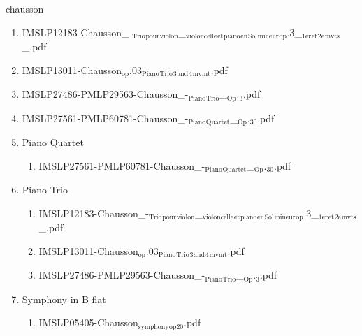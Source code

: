 \documentclass[11pt]{article}
\begin{document}
\item chausson
\label{sec-1-1-1-1-44-20}
\begin{enumerate}
\item IMSLP12183-Chausson\_-$_{\text{Trio}}$$_{\text{pour}}$$_{\text{violon}}$\_$_{\text{violoncelle}}$$_{\text{et}}$$_{\text{piano}}$$_{\text{en}}$$_{\text{Sol}}$$_{\text{mineur}}$$_{\text{op}}$.3\_$_{\text{1er}}$$_{\text{et}}$$_{\text{2e}}$$_{\text{mvts}}$\_.pdf
\label{sec-1-1-1-1-44-20-1}

\item IMSLP13011-Chausson$_{\text{op}}$.03$_{\text{Piano}}$$_{\text{Trio}}$$_{\text{3}}$$_{\text{and}}$$_{\text{4}}$$_{\text{mvmt}}$.pdf
\label{sec-1-1-1-1-44-20-2}

\item IMSLP27486-PMLP29563-Chausson\_-$_{\text{Piano}}$$_{\text{Trio}}$\_$_{\text{Op}}$.$_{\text{3}}$.pdf
\label{sec-1-1-1-1-44-20-3}

\item IMSLP27561-PMLP60781-Chausson\_-$_{\text{Piano}}$$_{\text{Quartet}}$\_$_{\text{Op}}$.$_{\text{30}}$.pdf
\label{sec-1-1-1-1-44-20-4}

\item Piano Quartet
\label{sec-1-1-1-1-44-20-5}
\begin{enumerate}
\item IMSLP27561-PMLP60781-Chausson\_-$_{\text{Piano}}$$_{\text{Quartet}}$\_$_{\text{Op}}$.$_{\text{30}}$.pdf
\label{sec-1-1-1-1-44-20-5-1}
\end{enumerate}

\item Piano Trio
\label{sec-1-1-1-1-44-20-6}
\begin{enumerate}
\item IMSLP12183-Chausson\_-$_{\text{Trio}}$$_{\text{pour}}$$_{\text{violon}}$\_$_{\text{violoncelle}}$$_{\text{et}}$$_{\text{piano}}$$_{\text{en}}$$_{\text{Sol}}$$_{\text{mineur}}$$_{\text{op}}$.3\_$_{\text{1er}}$$_{\text{et}}$$_{\text{2e}}$$_{\text{mvts}}$\_.pdf
\label{sec-1-1-1-1-44-20-6-1}

\item IMSLP13011-Chausson$_{\text{op}}$.03$_{\text{Piano}}$$_{\text{Trio}}$$_{\text{3}}$$_{\text{and}}$$_{\text{4}}$$_{\text{mvmt}}$.pdf
\label{sec-1-1-1-1-44-20-6-2}

\item IMSLP27486-PMLP29563-Chausson\_-$_{\text{Piano}}$$_{\text{Trio}}$\_$_{\text{Op}}$.$_{\text{3}}$.pdf
\label{sec-1-1-1-1-44-20-6-3}
\end{enumerate}

\item Symphony in B flat
\label{sec-1-1-1-1-44-20-7}
\begin{enumerate}
\item IMSLP05405-Chausson$_{\text{symphony}}$$_{\text{op20}}$.pdf
\label{sec-1-1-1-1-44-20-7-1}
\end{enumerate}
\end{enumerate}
\end{document}
